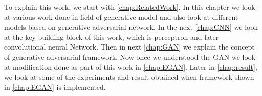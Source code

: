 To explain this work, we start with  \autoref{chap:RelatedWork}. In this chapter we look at various work done in field of generative model and also look at different models based on generative adversarial network. In the next \autoref{chap:CNN} we look at the key building block of this work, which is perceptron and later convolutional neural Network. Then in next \autoref{chap:GAN} we explain the concept of generative adversarial framework. Now once we understood the GAN we look at modification done as part of this work in \autoref{chap:EGAN}. Later in \autoref{chap:result}, we look at some of the experiments and result obtained when framework shown in \autoref{chap:EGAN} is implemented.